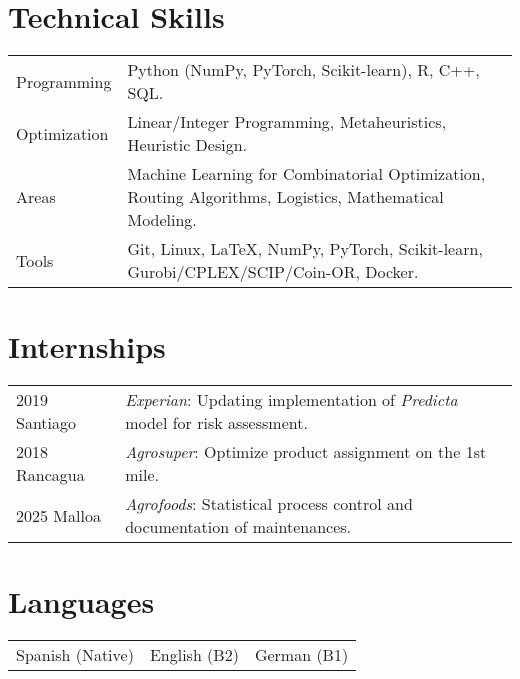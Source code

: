 \documentclass[10pt, a4paper]{article}
\begin{document}
\section*{Technical Skills}
\begin{tabular}{@{} p{} p{} @{}}
    Programming & Python (NumPy, PyTorch, Scikit-learn), R, C++, SQL. \\
    Optimization & Linear/Integer Programming, Metaheuristics, Heuristic Design.\\
    Areas & Machine Learning for Combinatorial Optimization, Routing Algorithms, Logistics, Mathematical Modeling.\\
    Tools & Git, Linux, \LaTeX, NumPy, PyTorch, Scikit-learn, Gurobi/CPLEX/SCIP/Coin-OR, Docker.\\
\end{tabular}

\section*{Internships}
\begin{tabular}{@{} p{} p{} @{}}
    2019 Santiago & \textit{Experian}: Updating implementation of \textit{Predicta} model for risk assessment.\\
    2018 Rancagua & \textit{Agrosuper}: Optimize product assignment on the 1st mile.\\
    2025 Malloa & \textit{Agrofoods}: Statistical process control and documentation of maintenances.\\
\end{tabular}

\section*{Languages}
\begin{tabular}{@{} p{} p{} p{} @{}}
    \centering
    Spanish (Native) & English (B2) & German (B1) \\
\end{tabular}
\end{document}
